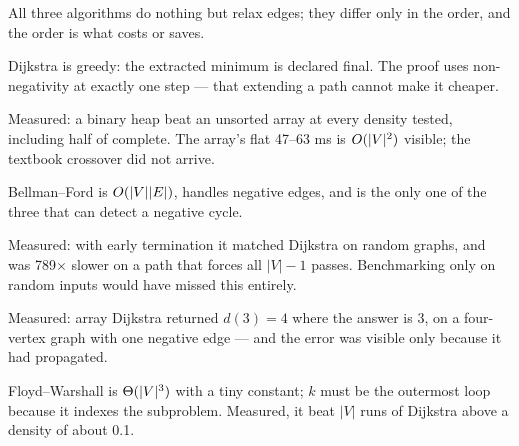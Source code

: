 \begin{chaptersummary}
\begin{tight}
  \item All three algorithms do nothing but relax edges; they differ only in the
        order, and the order is what costs or saves.
  \item Dijkstra is greedy: the extracted minimum is declared final. The proof
        uses non-negativity at exactly one step --- that extending a path cannot
        make it cheaper.
  \item Measured: a binary heap beat an unsorted array at every density tested,
        including half of complete. The array's flat 47--63 ms is
        $O(|V|^{2})$ visible; the textbook crossover did not arrive.
  \item Bellman--Ford is $O(|V||E|)$, handles negative edges, and is the
        only one of the three that can detect a negative cycle.
  \item Measured: with early termination it matched Dijkstra on random graphs,
        and was 789$\times$ slower on a path that forces all $|V|-1$ passes.
        Benchmarking only on random inputs would have missed this entirely.
  \item Measured: array Dijkstra returned $d(3) = 4$ where the answer is 3,
        on a four-vertex graph with one negative edge --- and the error was
        visible only because it had propagated.
  \item Floyd--Warshall is $\Theta(|V|^{3})$ with a tiny constant; $k$ must be
        the outermost loop because it indexes the subproblem. Measured, it beat
        $|V|$ runs of Dijkstra above a density of about 0.1.
\end{tight}
\end{chaptersummary}

